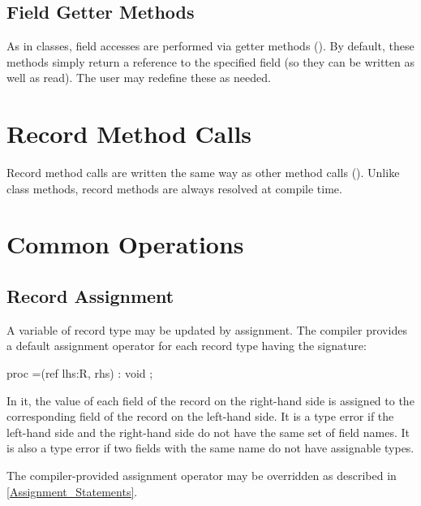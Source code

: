 \subsection{Field Getter Methods}
\label{Field_Getter_Methods}

As in classes, field accesses are performed via getter methods
().  By default, these methods simply return a reference to
the specified field (so they can be written as well as read).  The user may
redefine these as needed.

\section{Record Method Calls}
\label{Record_Method_Access}

Record method calls are written the same way as other method calls
(). Unlike class methods, record methods are
always resolved at compile time.

\section{Common Operations}

\subsection{Record Assignment}
\label{Record_Assignment}

A variable of record type may be updated by assignment.  The compiler
provides a default assignment operator for each record type 
having the signature:

\begin{chapel}
proc =(ref lhs:R, rhs) : void ;
\end{chapel}

In it, the value of each field of the record on the right-hand side is assigned
to the corresponding field of the record on the left-hand side. It is
a type error if the left-hand side and the right-hand side do not have
the same set of field names. It is also a type error if two fields with
the same name do not have assignable types.

The compiler-provided assignment operator may be overridden as described
in \ref{Assignment_Statements}.

